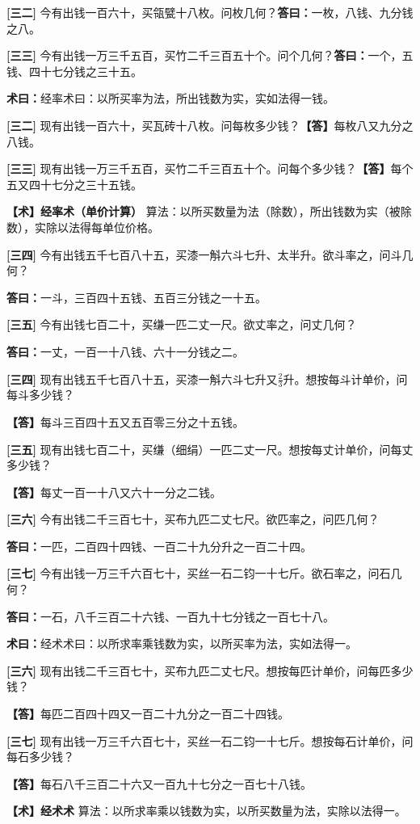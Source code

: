\documentclass[10pt,a4paper]{article}
\newlength{\lw}
\newlength{\rw}
\newcommand{\bilingc}[2]{%
  \par\vspace{0.1em}%
  \noindent\begin{minipage}[t]{\lw}
  {\small #1}
  \end{minipage}%
  \hfill%
  \begin{minipage}[t]{\rw}
  {\small #2}
  \end{minipage}%
  \vspace{0.1em}%
}
\newcommand{\da}{\textbf{\textcolor{answercolor}{答曰：}}}
\newcommand{\daB}{\textbf{\textcolor{answercolor}{【答】}}}
\newcommand{\shu}{\textbf{\textcolor{methodcolor}{术曰：}}}
\newcommand{\shuB}{\textbf{\textcolor{methodcolor}{【术】}}}
\newcommand{\pn}[1]{\textbf{[#1]}}
\newcommand{\sk}{\vspace{0.1em}}
\begin{document}
\vspace{0.3em}

\bilingc{
\pn{三二} 今有出钱一百六十，买瓴甓十八枚。问枚几何？\quad\da 一枚，八钱、九分钱之八。

\pn{三三} 今有出钱一万三千五百，买竹二千三百五十个。问个几何？\quad\da 一个，五钱、四十七分钱之三十五。

\shu 经率术曰：以所买率为法，所出钱数为实，实如法得一钱。
}{
\pn{三二} 现有出钱一百六十，买瓦砖十八枚。问每枚多少钱？\quad\daB 每枚八又九分之八钱。

\pn{三三} 现有出钱一万三千五百，买竹二千三百五十个。问每个多少钱？\quad\daB 每个五又四十七分之三十五钱。

\shuB \textbf{经率术（单价计算）} 算法：以所买数量为法（除数），所出钱数为实（被除数），实除以法得每单位价格。
}

\vspace{0.3em}

\bilingc{
\pn{三四} 今有出钱五千七百八十五，买漆一斛六斗七升、太半升。欲斗率之，问斗几何？

\da 一斗，三百四十五钱、五百三分钱之一十五。

\pn{三五} 今有出钱七百二十，买缣一匹二丈一尺。欲丈率之，问丈几何？

\da 一丈，一百一十八钱、六十一分钱之二。
}{
\pn{三四} 现有出钱五千七百八十五，买漆一斛六斗七升又$\frac23$升。想按每斗计单价，问每斗多少钱？

\daB 每斗三百四十五又五百零三分之十五钱。

\pn{三五} 现有出钱七百二十，买缣（细绢）一匹二丈一尺。想按每丈计单价，问每丈多少钱？

\daB 每丈一百一十八又六十一分之二钱。
}

\sk

\bilingc{
\pn{三六} 今有出钱二千三百七十，买布九匹二丈七尺。欲匹率之，问匹几何？

\da 一匹，二百四十四钱、一百二十九分升之一百二十四。

\pn{三七} 今有出钱一万三千六百七十，买丝一石二钧一十七斤。欲石率之，问石几何？

\da 一石，八千三百二十六钱、一百九十七分钱之一百七十八。

\shu 经术术曰：以所求率乘钱数为实，以所买率为法，实如法得一。
}{
\pn{三六} 现有出钱二千三百七十，买布九匹二丈七尺。想按每匹计单价，问每匹多少钱？

\daB 每匹二百四十四又一百二十九分之一百二十四钱。

\pn{三七} 现有出钱一万三千六百七十，买丝一石二钧一十七斤。想按每石计单价，问每石多少钱？

\daB 每石八千三百二十六又一百九十七分之一百七十八钱。

\shuB \textbf{经术术} 算法：以所求率乘以钱数为实，以所买数量为法，实除以法得一。
}
\end{document}
